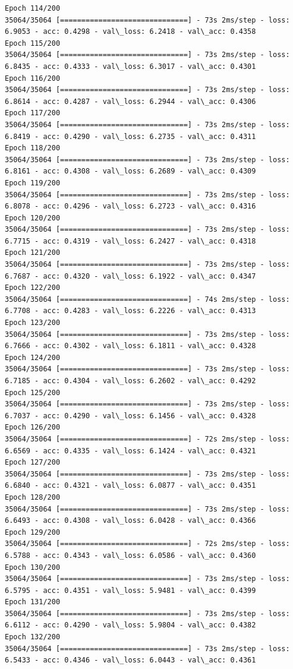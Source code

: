 \documentclass[11pt]{article}
\begin{document}
\begin{Verbatim}[commandchars=\\\{\}]
Epoch 114/200
35064/35064 [==============================] - 73s 2ms/step - loss: 6.9053 - acc: 0.4298 - val\_loss: 6.2418 - val\_acc: 0.4358
Epoch 115/200
35064/35064 [==============================] - 73s 2ms/step - loss: 6.8435 - acc: 0.4333 - val\_loss: 6.3017 - val\_acc: 0.4301
Epoch 116/200
35064/35064 [==============================] - 73s 2ms/step - loss: 6.8614 - acc: 0.4287 - val\_loss: 6.2944 - val\_acc: 0.4306
Epoch 117/200
35064/35064 [==============================] - 73s 2ms/step - loss: 6.8419 - acc: 0.4290 - val\_loss: 6.2735 - val\_acc: 0.4311
Epoch 118/200
35064/35064 [==============================] - 73s 2ms/step - loss: 6.8161 - acc: 0.4308 - val\_loss: 6.2689 - val\_acc: 0.4309
Epoch 119/200
35064/35064 [==============================] - 73s 2ms/step - loss: 6.8078 - acc: 0.4296 - val\_loss: 6.2723 - val\_acc: 0.4316
Epoch 120/200
35064/35064 [==============================] - 73s 2ms/step - loss: 6.7715 - acc: 0.4319 - val\_loss: 6.2427 - val\_acc: 0.4318
Epoch 121/200
35064/35064 [==============================] - 73s 2ms/step - loss: 6.7687 - acc: 0.4320 - val\_loss: 6.1922 - val\_acc: 0.4347
Epoch 122/200
35064/35064 [==============================] - 74s 2ms/step - loss: 6.7708 - acc: 0.4283 - val\_loss: 6.2226 - val\_acc: 0.4313
Epoch 123/200
35064/35064 [==============================] - 73s 2ms/step - loss: 6.7666 - acc: 0.4302 - val\_loss: 6.1811 - val\_acc: 0.4328
Epoch 124/200
35064/35064 [==============================] - 73s 2ms/step - loss: 6.7185 - acc: 0.4304 - val\_loss: 6.2602 - val\_acc: 0.4292
Epoch 125/200
35064/35064 [==============================] - 73s 2ms/step - loss: 6.7037 - acc: 0.4290 - val\_loss: 6.1456 - val\_acc: 0.4328
Epoch 126/200
35064/35064 [==============================] - 72s 2ms/step - loss: 6.6569 - acc: 0.4335 - val\_loss: 6.1424 - val\_acc: 0.4321
Epoch 127/200
35064/35064 [==============================] - 73s 2ms/step - loss: 6.6840 - acc: 0.4321 - val\_loss: 6.0877 - val\_acc: 0.4351
Epoch 128/200
35064/35064 [==============================] - 73s 2ms/step - loss: 6.6493 - acc: 0.4308 - val\_loss: 6.0428 - val\_acc: 0.4366
Epoch 129/200
35064/35064 [==============================] - 72s 2ms/step - loss: 6.5788 - acc: 0.4343 - val\_loss: 6.0586 - val\_acc: 0.4360
Epoch 130/200
35064/35064 [==============================] - 73s 2ms/step - loss: 6.5795 - acc: 0.4351 - val\_loss: 5.9481 - val\_acc: 0.4399
Epoch 131/200
35064/35064 [==============================] - 73s 2ms/step - loss: 6.6112 - acc: 0.4290 - val\_loss: 5.9804 - val\_acc: 0.4382
Epoch 132/200
35064/35064 [==============================] - 73s 2ms/step - loss: 6.5433 - acc: 0.4346 - val\_loss: 6.0443 - val\_acc: 0.4361

\end{Verbatim}
\end{document}
